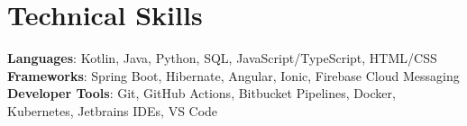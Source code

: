 \documentclass[letterpaper,11pt]{article}
\begin{document}
%
\section{Technical Skills}
 \begin{itemize}[leftmargin=0.15in, label={}]
    \small{\item{
     \textbf{Languages}{: Kotlin, Java, Python, SQL, JavaScript/TypeScript, HTML/CSS} \\
     \textbf{Frameworks}{: Spring Boot, Hibernate, Angular, Ionic, Firebase Cloud Messaging} \\
     \textbf{Developer Tools}{: Git, GitHub Actions, Bitbucket Pipelines, Docker, Kubernetes, Jetbrains IDEs, VS Code} \\
     \iffalse
     \textbf{Libraries}{: RxJS } \\
     \fi
    }}
 \end{itemize}


\end{document}
